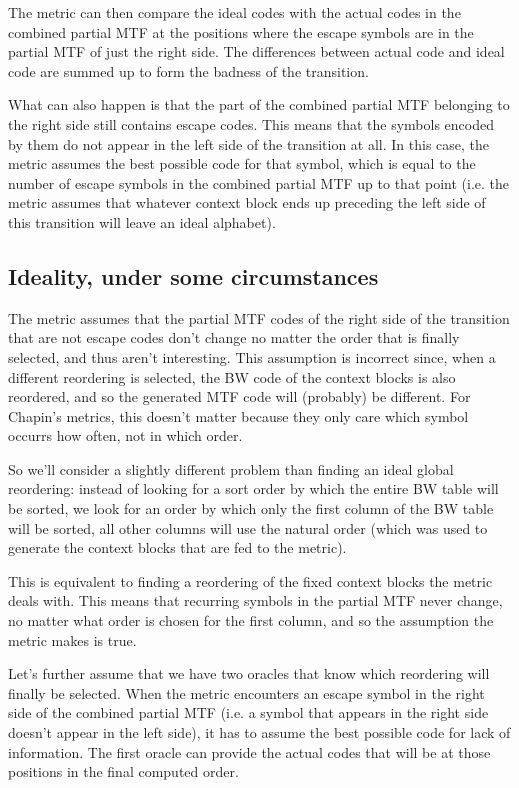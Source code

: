 \documentclass[a4paper]{scrreprt}
\begin{document}
The metric can then compare the ideal codes with the actual codes in the
combined partial MTF at the positions where the escape symbols are in the
partial MTF of just the right side. The differences between actual code and
ideal code are summed up to form the badness of the transition.

What can also happen is that the part of the combined partial MTF belonging to
the right side still contains escape codes. This means that the symbols encoded
by them do not appear in the left side of the transition at all. In this case,
the metric assumes the best possible code for that symbol, which is equal to the
number of escape symbols in the combined partial MTF up to that point (i.e. the
metric assumes that whatever context block ends up preceding the left side
of this transition will leave an ideal alphabet).

\subsection{Ideality, under some circumstances}

The metric assumes that the partial MTF codes of the right side of the
transition that are not escape codes don't change no matter the order that is
finally selected, and thus aren't interesting. This assumption is incorrect
since, when a different reordering is selected, the BW code of the context
blocks is also reordered, and so the generated MTF code will (probably) be
different. For Chapin's metrics, this doesn't matter because they only care
which symbol occurrs how often, not in which order.

So we'll consider a slightly different problem than finding an ideal global
reordering: instead of looking for a sort order by which the entire BW table
will be sorted, we look for an order by which only the first column of the BW
table will be sorted, all other columns will use the natural order (which was
used to generate the context blocks that are fed to the metric).


This is equivalent to finding a reordering of the fixed context blocks the
metric deals with. This means that recurring symbols in the partial MTF never
change, no matter what order is chosen for the first column, and so the
assumption the metric makes is true.

Let's further assume that we have two oracles that know which reordering will
finally be selected. When the metric encounters an escape symbol in the right
side of the combined partial MTF (i.e. a symbol that appears in the right side
doesn't appear in the left side), it has to assume the best possible code for
lack of information. The first oracle can provide the actual codes that will be
at those positions in the final computed order.
\end{document}
